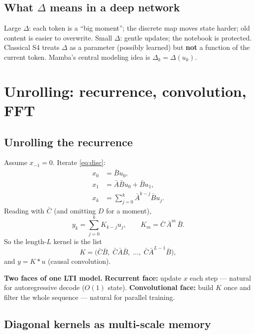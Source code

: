 \documentclass[11pt,a4paper]{article}
\begin{document}
\subsection{What $\Delta$ means in a deep network}

Large $\Delta$: each token is a ``big moment''; the discrete map moves state harder; old content is easier to overwrite.
Small $\Delta$: gentle updates; the notebook is protected.
Classical S4 treats $\Delta$ as a parameter (possibly learned) but \textbf{not} a function of the current token.
Mamba's central modeling idea is $\Delta_k=\Delta(u_k)$.

\section{Unrolling: recurrence, convolution, FFT}

\subsection{Unrolling the recurrence}

Assume $x_{-1}=0$. Iterate \eqref{eq:disc}:
\begin{align}
x_0&=\bar{B}u_0,\\
x_1&=\bar{A}\bar{B}u_0+\bar{B}u_1,\\
x_k&=\sum_{j=0}^{k}\bar{A}^{k-j}\bar{B}u_j.
\end{align}
Reading with $\bar{C}$ (and omitting $D$ for a moment),
\begin{equation}
y_k=\sum_{j=0}^{k}K_{k-j}u_j,\qquad
K_m=\bar{C}\,\bar{A}^{m}\,\bar{B}.
\label{eq:Km}
\end{equation}
So the length-$L$ kernel is the list
\begin{equation}
K=\big(\bar{C}\bar{B},\;\bar{C}\bar{A}\bar{B},\;\ldots,\;\bar{C}\bar{A}^{L-1}\bar{B}\big),
\end{equation}
and $y=K*u$ (causal convolution).

\begin{notebox}
\textbf{Two faces of one LTI model.}
\textbf{Recurrent face:} update $x$ each step --- natural for autoregressive decode ($O(1)$ state).
\textbf{Convolutional face:} build $K$ once and filter the whole sequence --- natural for parallel training.
\end{notebox}

\subsection{Diagonal kernels as multi-scale memory}
\end{document}
